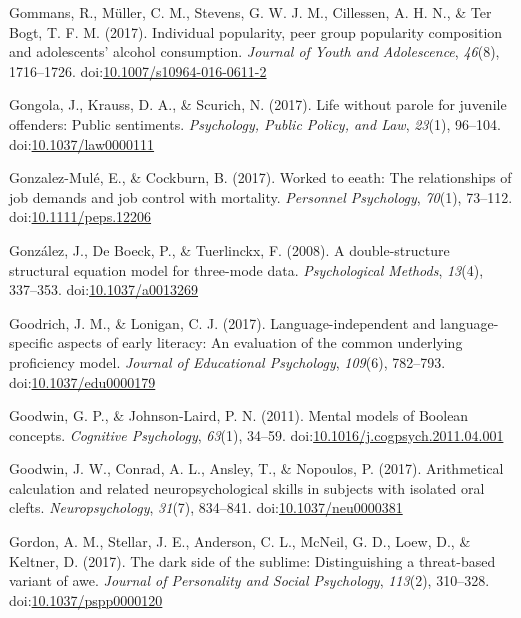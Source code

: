 \documentclass[english,man]{apa6}
\begin{document}
\hypertarget{ref-Gommans2017}{}
Gommans, R., Müller, C. M., Stevens, G. W. J. M., Cillessen, A. H. N.,
\& Ter Bogt, T. F. M. (2017). Individual popularity, peer group
popularity composition and adolescents' alcohol consumption.
\emph{Journal of Youth and Adolescence}, \emph{46}(8), 1716--1726.
doi:\href{https://doi.org/10.1007/s10964-016-0611-2}{10.1007/s10964-016-0611-2}

\hypertarget{ref-Gongola2017}{}
Gongola, J., Krauss, D. A., \& Scurich, N. (2017). Life without parole
for juvenile offenders: Public sentiments. \emph{Psychology, Public
Policy, and Law}, \emph{23}(1), 96--104.
doi:\href{https://doi.org/10.1037/law0000111}{10.1037/law0000111}

\hypertarget{ref-Gonzalez-Mule2017}{}
Gonzalez-Mulé, E., \& Cockburn, B. (2017). Worked to eeath: The
relationships of job demands and job control with mortality.
\emph{Personnel Psychology}, \emph{70}(1), 73--112.
doi:\href{https://doi.org/10.1111/peps.12206}{10.1111/peps.12206}

\hypertarget{ref-Gonzalez2008}{}
González, J., De Boeck, P., \& Tuerlinckx, F. (2008). A double-structure
structural equation model for three-mode data. \emph{Psychological
Methods}, \emph{13}(4), 337--353.
doi:\href{https://doi.org/10.1037/a0013269}{10.1037/a0013269}

\hypertarget{ref-Goodrich2017}{}
Goodrich, J. M., \& Lonigan, C. J. (2017). Language-independent and
language-specific aspects of early literacy: An evaluation of the common
underlying proficiency model. \emph{Journal of Educational Psychology},
\emph{109}(6), 782--793.
doi:\href{https://doi.org/10.1037/edu0000179}{10.1037/edu0000179}

\hypertarget{ref-Goodwin2011}{}
Goodwin, G. P., \& Johnson-Laird, P. N. (2011). Mental models of Boolean
concepts. \emph{Cognitive Psychology}, \emph{63}(1), 34--59.
doi:\href{https://doi.org/10.1016/j.cogpsych.2011.04.001}{10.1016/j.cogpsych.2011.04.001}

\hypertarget{ref-Goodwin2017}{}
Goodwin, J. W., Conrad, A. L., Ansley, T., \& Nopoulos, P. (2017).
Arithmetical calculation and related neuropsychological skills in
subjects with isolated oral clefts. \emph{Neuropsychology},
\emph{31}(7), 834--841.
doi:\href{https://doi.org/10.1037/neu0000381}{10.1037/neu0000381}

\hypertarget{ref-Gordon2017}{}
Gordon, A. M., Stellar, J. E., Anderson, C. L., McNeil, G. D., Loew, D.,
\& Keltner, D. (2017). The dark side of the sublime: Distinguishing a
threat-based variant of awe. \emph{Journal of Personality and Social
Psychology}, \emph{113}(2), 310--328.
doi:\href{https://doi.org/10.1037/pspp0000120}{10.1037/pspp0000120}
\end{document}
